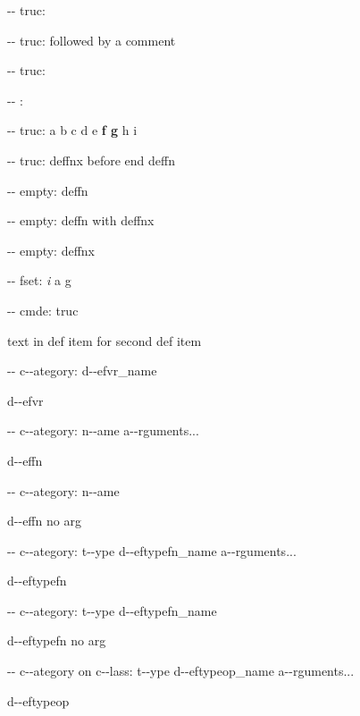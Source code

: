 \documentclass{book}
\begin{document}
%
\hbox{}{-}{-} truc: 


\hbox{}{-}{-} truc: followed by a comment


%
\hbox{}{-}{-} truc: 


\hbox{}{-}{-} : 


\hbox{}{-}{-} truc: a b c d e \textbf{f g} h i


%
\hbox{}{-}{-} truc: deffnx before end deffn


%


\hbox{}{-}{-} empty: deffn


%

\hbox{}{-}{-} empty: deffn with deffnx


%
\hbox{}{-}{-} empty: deffnx


%

\hbox{}{-}{-} fset: \emph{i} a g


%
\hbox{}{-}{-} cmde: truc 


%
text in def item for second def item


\hbox{}{-}{-} c{-}{-}ategory: d{-}{-}efvr\_name


%
d{-}{-}efvr

\hbox{}{-}{-} c{-}{-}ategory: n{-}{-}ame a{-}{-}rguments...


%
d{-}{-}effn

\hbox{}{-}{-} c{-}{-}ategory: n{-}{-}ame


%
d{-}{-}effn no arg

\hbox{}{-}{-} c{-}{-}ategory: t{-}{-}ype d{-}{-}eftypefn\_name a{-}{-}rguments...


%
d{-}{-}eftypefn

\hbox{}{-}{-} c{-}{-}ategory: t{-}{-}ype d{-}{-}eftypefn\_name


%
d{-}{-}eftypefn no arg

\hbox{}{-}{-} c{-}{-}ategory on c{-}{-}lass: t{-}{-}ype d{-}{-}eftypeop\_name a{-}{-}rguments...


%
d{-}{-}eftypeop
\end{document}
